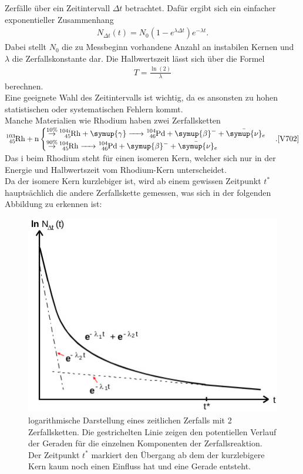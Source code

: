 Zerfälle über ein Zeitintervall $\Delta t$ betrachtet. Dafür ergibt sich ein
einfacher exponentieller Zusammenhang \cite{V702}
\begin{align}
    N_{\Delta t} (t) = N_0 (1-e^{\lambda \Delta t}) e^{- \lambda t}. \label{eq:5} 
\end{align}
Dabei stellt $N_0$ die zu Messbeginn vorhandene Anzahl an instabilen Kernen und $\lambda$ die Zerfallskonstante dar.
Die Halbwertszeit lässt sich über die Formel \cite{V702}
\begin{align}
    T=\frac{\ln(2)}{\lambda} \label{eq:6}
\end{align}
berechnen.\\
Eine geeignete Wahl des Zeitintervalls ist wichtig, da es ansonsten zu hohen
statistischen oder systematischen Fehlern kommt.\\
Manche Materialien wie Rhodium haben zwei Zerfallsketten\\
$\ce{^{103}_{45}Rh + n}  
\begin{cases}
    \ce{\stackrel{10\%}{\to} ^{104i}_{45}Rh +\symup{\gamma} -> ^{104}_{46}Pd +\symup{\beta}^- + \bar{\symup{\nu}}_e }\\
    \ce{\stackrel{90\%}{\to} ^{104}_{45}Rh ->  ^{104}_{46}Pd +\symup{\beta}^- + \bar{\symup{\nu}}_e }
\end{cases}.\text{\cite{V702}}
$
Das i beim Rhodium steht für einen isomeren Kern, welcher sich nur in der Energie und
Halbwertszeit vom Rhodium-Kern unterscheidet.\\
Da der isomere Kern kurzlebiger ist, wird ab einem gewissen Zeitpunkt $t^*$ hauptsächlich
die andere Zerfallskette gemessen, was sich in der folgenden Abbildung zu erkennen ist:
\begin{figure}[H]
    \centering
    \includegraphics[width=\linewidth]{images/Rh_theo.jpg}
    \caption{logarithmische Darstellung eines zeitlichen Zerfalls mit
    2 Zerfallsketten\cite{V702}.
    Die gestrichelten Linie zeigen den potentiellen Verlauf der Geraden für die 
    einzelnen Komponenten der Zerfallsreaktion. Der Zeitpunkt $t^*$ markiert den Übergang ab
    dem der kurzlebigere Kern kaum noch einen Einfluss hat und eine Gerade entsteht.
    }
    \label{fig:2}
\end{figure}


